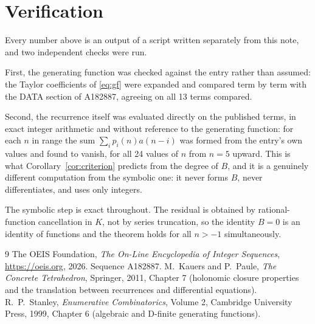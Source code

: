 \documentclass[11pt,a4paper]{article}
\theoremstyle{plain}
\theoremstyle{definition}
\begin{document}
\section{Verification}

Every number above is an output of a script written separately from this note, and two
independent checks were run.

First, the generating function was checked against the entry rather than assumed: the
Taylor coefficients of \eqref{eq:gf} were expanded and compared term by term with the DATA
section of A182887, agreeing on all 13 terms compared.

Second, the recurrence itself was evaluated directly on the published terms, in exact
integer arithmetic and without reference to the generating function: for each $n$ in range
the sum $\sum_{i}p_{i}(n)a(n-i)$ was formed from the entry's own values and found to
vanish, for all 24 values of $n$ from $n=5$ upward. This is what
Corollary~\ref{cor:criterion} predicts from the degree of $B$, and it is a genuinely
different computation from the symbolic one: it never forms $B$, never differentiates, and
uses only integers.

The symbolic step is exact throughout. The residual is obtained by rational-function
cancellation in $K$, not by series truncation, so the identity $B=0$ is an
identity of functions and the theorem holds for all $n>-1$ simultaneously.

\begin{thebibliography}{9}
 The OEIS Foundation, \emph{The On-Line Encyclopedia of Integer Sequences},
\url{https://oeis.org}, 2026. Sequence A182887.
 M.~Kauers and P.~Paule, \emph{The Concrete Tetrahedron}, Springer, 2011,
Chapter 7 (holonomic closure properties and the translation between recurrences and
differential equations).
 R.~P.~Stanley, \emph{Enumerative Combinatorics}, Volume 2, Cambridge
University Press, 1999, Chapter 6 (algebraic and D-finite generating functions).
\end{thebibliography}
\end{document}
